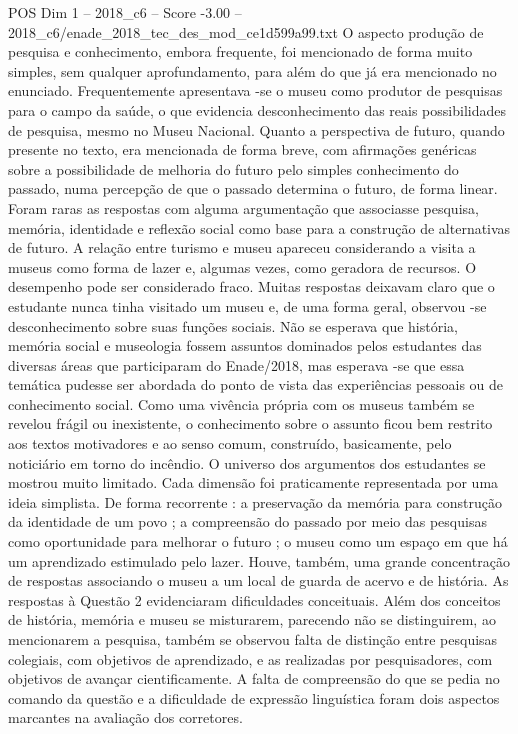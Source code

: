 \begin{textsample}{POS Dim 1 – 2018\_c6 – Score -3.00 – 2018\_c6/enade\_2018\_tec\_des\_mod\_ce1d599a99.txt}
O aspecto produção de pesquisa e conhecimento, embora frequente, foi mencionado de forma muito simples, sem qualquer aprofundamento, para além do que já era mencionado no enunciado.
Frequentemente apresentava -se o museu como produtor de pesquisas para o campo da saúde, o que evidencia desconhecimento das reais possibilidades de pesquisa, mesmo no Museu Nacional.
Quanto a perspectiva de futuro, quando presente no texto, era mencionada de forma breve, com afirmações genéricas sobre a possibilidade de melhoria do futuro pelo simples conhecimento do passado, numa percepção de que o passado determina o futuro, de forma linear.
Foram raras as respostas com alguma argumentação que associasse pesquisa, memória, identidade e reflexão social como base para a construção de alternativas de futuro.
A relação entre turismo e museu apareceu considerando a visita a museus como forma de lazer e, algumas vezes, como geradora de recursos.
O desempenho pode ser considerado fraco.
Muitas respostas deixavam claro que o estudante nunca tinha visitado um museu e, de uma forma geral, observou -se desconhecimento sobre suas funções sociais.
Não se esperava que história, memória social e museologia fossem assuntos dominados pelos estudantes das diversas áreas que participaram do Enade/2018, mas esperava -se que essa temática pudesse ser abordada do ponto de vista das experiências pessoais ou de conhecimento social.
Como uma vivência própria com os museus também se revelou frágil ou inexistente, o conhecimento sobre o assunto ficou bem restrito aos textos motivadores e ao senso comum, construído, basicamente, pelo noticiário em torno do incêndio.
O universo dos argumentos dos estudantes se mostrou muito limitado.
Cada dimensão foi praticamente representada por uma ideia simplista.
De forma recorrente : a preservação da memória para construção da identidade de um povo ; a compreensão do passado por meio das pesquisas como oportunidade para melhorar o futuro ; o museu como um espaço em que há um aprendizado estimulado pelo lazer.
Houve, também, uma grande concentração de respostas associando o museu a um local de guarda de acervo e de história.
As respostas à Questão 2 evidenciaram dificuldades conceituais.
Além dos conceitos de história, memória e museu se misturarem, parecendo não se distinguirem, ao mencionarem a pesquisa, também se observou falta de distinção entre pesquisas colegiais, com objetivos de aprendizado, e as realizadas por pesquisadores, com objetivos de avançar cientificamente.
A falta de compreensão do que se pedia no comando da questão e a dificuldade de expressão linguística foram dois aspectos marcantes na avaliação dos corretores.

\end{textsample}
